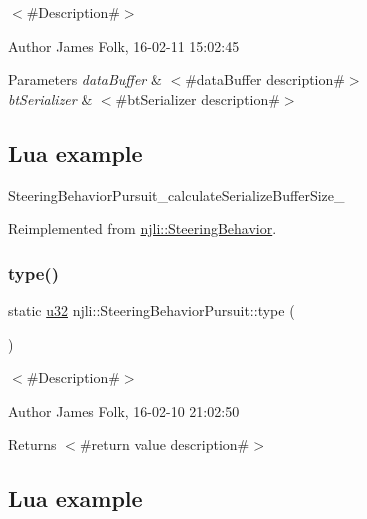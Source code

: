 $<$\#\+Description\#$>$ 

\begin{DoxyAuthor}{Author}
James Folk, 16-\/02-\/11 15\+:02\+:45
\end{DoxyAuthor}

\begin{DoxyParams}{Parameters}
{\em data\+Buffer} & $<$\#data\+Buffer description\#$>$ \\
\hline
{\em bt\+Serializer} & $<$\#bt\+Serializer description\#$>$\\
\hline
\end{DoxyParams}
\hypertarget{classnjli_1_1_steering_behavior_wander_ex1}{}\subsection{Lua example}\label{classnjli_1_1_steering_behavior_wander_ex1}

\begin{DoxyCodeInclude}
\end{DoxyCodeInclude}
Steering\+Behavior\+Pursuit\+\_\+calculate\+Serialize\+Buffer\+Size\+\_\+ 

Reimplemented from \mbox{\hyperlink{classnjli_1_1_steering_behavior_aa8494cb4a327c0040f64cfe8b393786e}{njli\+::\+Steering\+Behavior}}.

\mbox{\label{classnjli_1_1_steering_behavior_pursuit_a82fda2fba164704e2c00b11cd7692751}} 
\subsubsection{\texorpdfstring{type()}{type()}}
{\footnotesize\ttfamily static \mbox{\hyperlink{_util_8h_a10e94b422ef0c20dcdec20d31a1f5049}{u32}} njli\+::\+Steering\+Behavior\+Pursuit\+::type (\begin{DoxyParamCaption}{ }\end{DoxyParamCaption})\hspace{0.3cm}{\ttfamily [static]}}



$<$\#\+Description\#$>$ 

\begin{DoxyAuthor}{Author}
James Folk, 16-\/02-\/10 21\+:02\+:50
\end{DoxyAuthor}
\begin{DoxyReturn}{Returns}
$<$\#return value description\#$>$
\end{DoxyReturn}
\hypertarget{classnjli_1_1_steering_behavior_wander_ex1}{}\subsection{Lua example}\label{classnjli_1_1_steering_behavior_wander_ex1}

